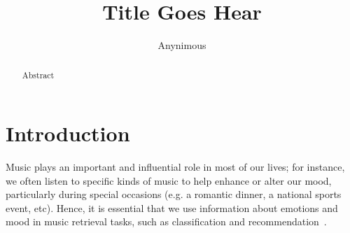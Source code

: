 \documentclass{llncs}
\begin{document}
	
\title{Title Goes Hear}
\author{Anynimous}
\maketitle

\begin{abstract}
Abstract
\end{abstract}


\section{Introduction}


Music plays an important and influential role in most of our lives; for instance, we often listen to specific kinds of music to help enhance or alter our mood, particularly during special occasions (e.g. a romantic dinner, a national sports event, etc). Hence, it is essential that we use information about emotions and mood in music retrieval tasks, such as classification and recommendation~\cite{li}. 
\end{document}
